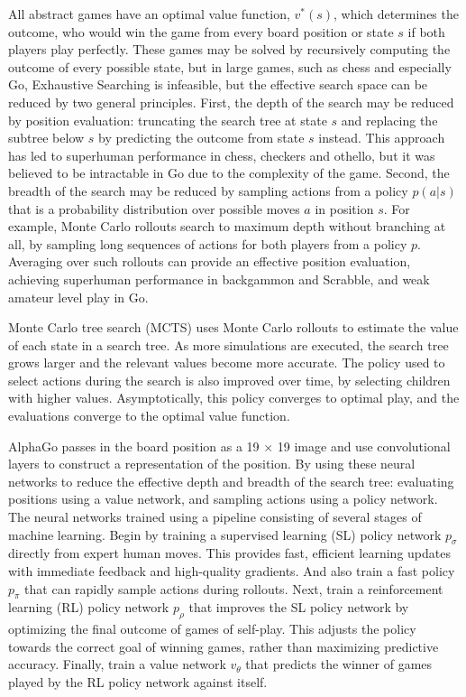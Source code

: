 \documentclass[12pt,a4paper]{article}
\begin{document}
{\hspace{0cm} All abstract games have an optimal value function, \(v^*(s)\), which determines the outcome, who would win the game from every board position or state \(s\) if both players play perfectly. These games may be solved by recursively computing the outcome of every possible state, but in large games, such as chess\cite{AISearching} and especially Go\cite{AISearching}, Exhaustive Searching is infeasible\cite{Solved}\cite{Thegamesplay}, but the effective search space can be reduced by two general principles. First, the depth of the search may be reduced by position evaluation: truncating the search tree at state \(s\) and replacing the subtree below \(s\) by predicting the outcome from state \(s\) instead. This approach has led to superhuman performance in chess\cite{DeepBlue}, checkers\cite{Caliber} and othello\cite{BuroOth}, but it was believed to be intractable in Go due to the complexity of the game\cite{MullerComGo}. Second, the breadth of the search may be reduced by sampling actions from a policy \(p(a|s)\) that is a probability distribution over possible moves \(a\) in position \(s\). For example, Monte Carlo rollouts\cite{MCR} search to maximum depth without branching at all, by sampling long sequences of actions for both players from a policy \(p\). Averaging over such rollouts can provide an effective position evaluation, achieving superhuman performance in backgammon\cite{MCR} and Scrabble\cite{Scrabble}, and weak amateur level play in Go\cite{Bouzy_2004}.\par
\hspace{0cm} Monte Carlo tree search (MCTS)\cite{CoulomMCTS}\cite{KocsisMCTS} uses Monte Carlo rollouts to estimate the value of each state in a search tree. As more simulations are executed, the search tree grows larger and the relevant values become more accurate. The policy used to select actions during the search is also improved over time, by selecting children with higher values. Asymptotically, this policy converges to optimal play, and the evaluations converge to the optimal value function\cite{KocsisMCTS}. \par
AlphaGo passes in the board position as a 19 × 19 image and use convolutional layers to construct a representation of the position. By using these neural networks to reduce the effective depth and breadth of the search tree: evaluating positions using a value network, and sampling actions using a policy network. The neural networks trained using a pipeline consisting of several stages of machine learning. Begin by training a supervised learning (SL) policy network \(p_\sigma\) directly from expert human moves. This provides fast, efficient learning updates with immediate feedback and high-quality gradients. And also train a fast policy \(p_\pi\) that can rapidly sample actions during rollouts. Next, train a reinforcement learning (RL) policy network \(p_\rho\) that improves the SL policy network by optimizing the final outcome of games of self-play. This adjusts the policy towards the correct goal of winning games, rather than maximizing predictive accuracy. Finally, train a value network \(v_\theta\) that predicts the winner of games played by the RL policy network against itself.\par
}
\end{document}
